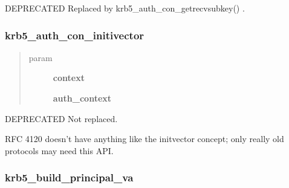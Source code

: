 \documentclass[letterpaper,10pt,english]{sphinxmanual}
\begin{document}
DEPRECATED Replaced by krb5\_auth\_con\_getrecvsubkey() .


\subsubsection{krb5\_auth\_con\_initivector}
\label{appdev/refs/api/krb5_auth_con_initivector:krb5-auth-con-initivector}\label{appdev/refs/api/krb5_auth_con_initivector::doc}

\begin{fulllineitems}
\label{appdev/refs/api/krb5_auth_con_initivector:c.krb5_auth_con_initivector}
\end{fulllineitems}

\begin{quote}\begin{description}
\item[{param}] \leavevmode
\textbf{context}

\textbf{auth\_context}

\end{description}\end{quote}

DEPRECATED Not replaced.

RFC 4120 doesn't have anything like the initvector concept; only really old protocols may need this API.


\subsubsection{krb5\_build\_principal\_va}
\label{appdev/refs/api/krb5_build_principal_va:krb5-build-principal-va}\label{appdev/refs/api/krb5_build_principal_va::doc}

\begin{fulllineitems}
\label{appdev/refs/api/krb5_build_principal_va:c.krb5_build_principal_va}
\end{fulllineitems}
\end{document}
